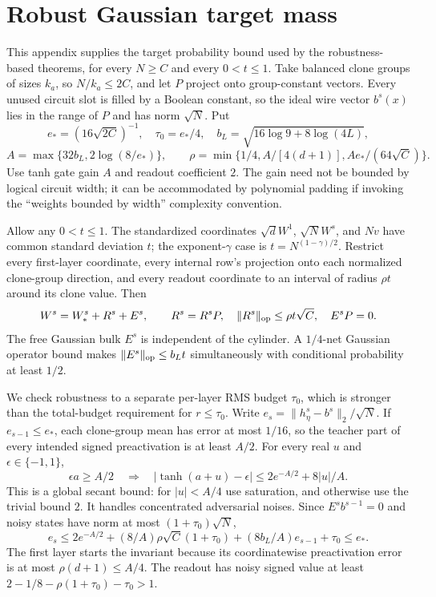 \section{Robust Gaussian target mass}\label{sec:cylinder}

This appendix supplies the target probability bound used by the robustness-based theorems, for every $N\ge C$ and every $0<t\le1$.
Take balanced clone groups of sizes $k_a$, so $N/k_a\le2C$, and let $P$
project onto group-constant vectors. Every unused circuit slot is filled by
a Boolean constant, so the ideal wire vector $b^s(x)$ lies in the range of
$P$ and has norm $\sqrt N$.
Put
\[
 e_*=(16\sqrt{2C})^{-1},\quad \tau_0=e_*/4,\quad
 b_L=\sqrt{16\log9+8\log(4L)},
\]
\[
 A=\max\{32b_L,2\log(8/e_*)\},\qquad
 \rho=\min\{1/4,A/[4(d+1)],Ae_*/(64\sqrt C)\}.
\]
Use tanh gate gain $A$ and readout coefficient $2$. The gain need not be
bounded by logical circuit width; it can be accommodated by polynomial
padding if invoking the ``weights bounded by width'' complexity convention.

Allow any $0<t\le1$. The standardized coordinates
$\sqrt d W^1$, $\sqrt N W^s$, and $Nv$ have common standard deviation $t$;
the exponent-$\gamma$ case is $t=N^{(1-\gamma)/2}$.
Restrict every first-layer coordinate, every
internal row's projection onto each normalized clone-group direction, and
every readout coordinate to an interval of radius $\rho t$ around its clone
value. Then
\[
 W^s=W_*^s+R^s+E^s,\qquad R^s=R^sP,
 \quad\|R^s\|_{\mathrm{op}}\le\rho t\sqrt C,\quad E^sP=0.
\]
The free Gaussian bulk $E^s$ is independent of the cylinder. A $1/4$-net
Gaussian operator bound makes $\|E^s\|_{\mathrm{op}}\le b_Lt$ simultaneously with
conditional probability at least $1/2$.

We check robustness to a separate per-layer RMS budget $\tau_0$, which is
stronger than the total-budget requirement for $r\le\tau_0$. Write
$e_s=\|h^s_\eta-b^s\|_2/\sqrt N$. If $e_{s-1}\le e_*$, each clone-group
mean has error at most $1/16$, so the teacher part of every intended signed
preactivation is at least $A/2$. For every real $u$ and $\epsilon\in\{-1,1\}$,
\[
 \epsilon a\ge A/2\quad\Longrightarrow\quad
 |\tanh(a+u)-\epsilon|\le2e^{-A/2}+8|u|/A.
\]
This is a global secant bound: for $|u|<A/4$ use saturation, and otherwise
use the trivial bound $2$. It handles concentrated adversarial noises.
Since $E^sb^{s-1}=0$ and noisy states have norm at most
$(1+\tau_0)\sqrt N$,
\[
 e_s\le2e^{-A/2}+(8/A)\rho\sqrt C(1+\tau_0)
 +(8b_L/A)e_{s-1}+\tau_0\le e_*.
\]
The first layer starts the invariant because its coordinatewise
preactivation error is at most $\rho(d+1)\le A/4$.
The readout has noisy signed value at least
$2-1/8-\rho(1+\tau_0)-\tau_0>1$.


